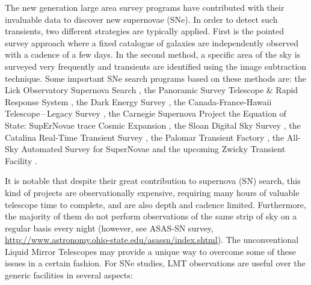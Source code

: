 \documentclass[useAMS,usenatbib]{mnras}
\begin{document}
The new generation large area survey programs have contributed with their invaluable data to discover 
new supernovae (SNe). In order to detect such transients, two different strategies are typically applied. 
First is the pointed survey approach where a fixed catalogue of galaxies are independently observed with 
a cadence of a few days. In the second method, a specific area of the sky is surveyed very frequently 
and transients are identified using the image subtraction technique. Some important SNe search programs 
based on these methods are: the Lick Observatory Supernova Search \citep[LOSS;][]{2000AIPC..522..103L},
the Panoramic Survey Telescope \& Rapid Response System \citep[Pan-STARRS;][]{2002SPIE.4836..154K},
the Dark Energy Survey \citep[DES;][]{2005astro.ph.10346T},
the Canada-France-Hawaii Telescope\,--\,Legacy Survey \citep[CFHT\,--\,LS;][]{2006A&A...447...31A},
the Carnegie Supernova Project \citep[CSP;][]{2006PASP..118....2H}
the Equation of State: SupErNovae trace Cosmic Expansion \citep[ESSENCE;][]{2007ApJ...666..674M,2007ApJ...666..694W},
the Sloan Digital Sky Survey \citep[SDSS;][]{2008AJ....135..338F,2008AJ....135..348S},
the Catalina Real-Time Transient Survey \citep[CRTS;][]{2009ApJ...696..870D},
the Palomar Transient Factory \citep[PTF;][]{2009PASP..121.1395L}, 
the All-Sky Automated Survey for SuperNovae \citep[ASAS-SN;][]{2014ApJ...788...48S} and the upcoming 
Zwicky Transient Facility \citep[ZTF;][]{2014htu..conf...27B}. 

It is notable that despite their great contribution to supernova (SN) search, this kind of projects are 
observationally expensive, requiring many hours of valuable telescope time to complete, and are also
depth and cadence limited. 
Furthermore, the majority of them do not perform observations of the same strip of
sky on a regular basis every night (however, see ASAS-SN survey, \url{http://www.astronomy.ohio-state.edu/asassn/index.shtml}).
The unconventional Liquid Mirror Telescopes \citep[LMTs,][]{1985PASP...97..454B,1992ApJ...393..829B,
1993PASP..105..501H} may provide a unique way to overcome some of these issues in a certain fashion. 
For SNe studies, LMT observations are useful over the generic facilities in several 
aspects: 
\end{document}
